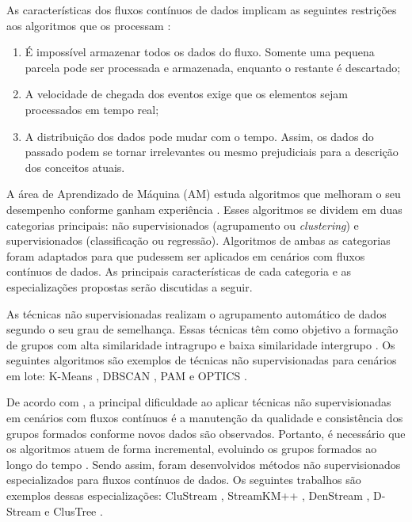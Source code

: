 \documentclass[msc, classic, a4paper]{ufbathesis}
\begin{document}
As características dos fluxos contínuos de dados implicam as seguintes restrições aos algoritmos que os processam \cite{bifet2009data}:
%
\begin{enumerate}
    \item É impossível armazenar todos os dados do fluxo. Somente uma pequena parcela pode ser processada e armazenada, enquanto o restante é descartado;
    \item A velocidade de chegada dos eventos exige que os elementos sejam processados em tempo real;
    \item A distribuição dos dados pode mudar com o tempo. Assim, os dados do passado podem se tornar irrelevantes ou mesmo prejudiciais para a descrição dos conceitos atuais.
\end{enumerate}

A área de Aprendizado de Máquina (AM) estuda algoritmos que melhoram o seu desempenho conforme ganham experiência \cite{Mitchell:1997:ML:541177}.
%
Esses algoritmos se dividem em duas categorias principais:
%
não supervisionados (agrupamento ou \textit{clustering}) e supervisionados (classificação ou regressão).
%
Algoritmos de ambas as categorias foram adaptados para que pudessem ser aplicados em cenários com fluxos contínuos de dados.
%
As principais características de cada categoria e as especializações propostas serão discutidas a seguir.

As técnicas não supervisionadas realizam o agrupamento automático de dados segundo o seu grau de semelhança.
Essas técnicas têm como objetivo a formação de grupos com alta similaridade intragrupo e baixa similaridade intergrupo \cite{Jain:1988:ACD:46712}.
Os seguintes algoritmos são exemplos de técnicas não supervisionadas para cenários em lote:
K-Means \cite{Lloyd:2006:LSQ:2263356.2269955},
DBSCAN \cite{Ester:1996:DAD:3001460.3001507},
PAM \cite{kaufman:clustering1990} e
OPTICS \cite{Ankerst:1999:OOP:304181.304187}.

De acordo com , a principal dificuldade ao aplicar técnicas não supervisionadas em cenários com fluxos contínuos é a manutenção da qualidade e consistência dos grupos formados conforme novos dados são observados.
Portanto, é necessário que os algoritmos atuem de forma incremental, evoluindo os grupos formados ao longo do tempo \cite{Barbara:2002:RCD:507515.507519}.
Sendo assim, foram desenvolvidos métodos não supervisionados especializados para fluxos contínuos de dados.
Os seguintes trabalhos são exemplos dessas especializações:
CluStream \cite{Aggarwal:2003:FCE:1315451.1315460},
StreamKM++ \cite{Ackermann:2012:SCA:2133803.2184450},
DenStream \cite{Cao:Feng:Ester},
D-Stream \cite{Chen:Tu} e ClusTree \cite{Kranen:2011:CIM:2134350.2134352}.
\end{document}
